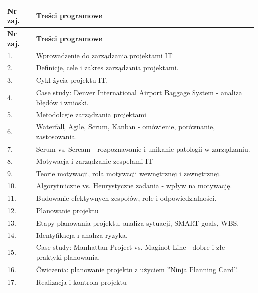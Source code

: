 \documentclass[12pt, a4paper]{article}
\newcommand{\thdrule}{\noalign{\global\setlength{\extrarowheight}{0pt}}}
\newcommand{\thdend}{\noalign{\global\setlength{\extrarowheight}{3pt}}}
\begin{document}
{\scriptsize
\begin{longtable}{m{1.5cm}m{14.5cm}}
\thdrule\toprule
\rowcolor{pjatkRed} {\color{white}\textbf{Nr zaj.}} & {\color{white}\textbf{Treści programowe}} \\
\midrule\thdend
\endfirsthead
\thdrule\toprule
\rowcolor{pjatkRed} {\color{white}\textbf{Nr zaj.}} & {\color{white}\textbf{Treści programowe}} \\
\midrule\thdend
\endhead
  \rowcolor{tableRowLight} 1. & Wprowadzenie do zarządzania projektami IT \\
  \rowcolor{tableRowAlt} 2. & Definicje, cele i zakres zarządzania projektami. \\
  \rowcolor{tableRowLight} 3. & Cykl życia projektu IT. \\
  \rowcolor{tableRowAlt} 4. & Case study: Denver International Airport Baggage System - analiza błędów i wnioski. \\
  \rowcolor{tableRowLight} 5. & Metodologie zarządzania projektami \\
  \rowcolor{tableRowAlt} 6. & Waterfall, Agile, Scrum, Kanban - omówienie, porównanie, zastosowania. \\
  \rowcolor{tableRowLight} 7. & Scrum vs. Scream - rozpoznawanie i unikanie patologii w zarządzaniu. \\
  \rowcolor{tableRowAlt} 8. & Motywacja i zarządzanie zespołami IT \\
  \rowcolor{tableRowLight} 9. & Teorie motywacji, rola motywacji wewnętrznej i zewnętrznej. \\
  \rowcolor{tableRowAlt} 10. & Algorytmiczne vs. Heurystyczne zadania - wpływ na motywację. \\
  \rowcolor{tableRowLight} 11. & Budowanie efektywnych zespołów, role i odpowiedzialności. \\
  \rowcolor{tableRowAlt} 12. & Planowanie projektu \\
  \rowcolor{tableRowLight} 13. & Etapy planowania projektu, analiza sytuacji, SMART goals, WBS. \\
  \rowcolor{tableRowAlt} 14. & Identyfikacja i analiza ryzyka. \\
  \rowcolor{tableRowLight} 15. & Case study: Manhattan Project vs. Maginot Line - dobre i złe praktyki planowania. \\
  \rowcolor{tableRowAlt} 16. & Ćwiczenia: planowanie projektu z użyciem ''Ninja Planning Card''. \\
  \rowcolor{tableRowLight} 17. & Realizacja i kontrola projektu \\

\end{longtable}}
\end{document}
